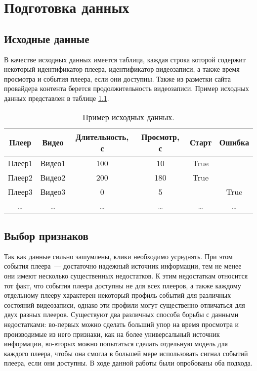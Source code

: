 \chapter{Подготовка данных}

\section{Исходные данные}

В качестве исходных данных имеется таблица, каждая строка которой содержит некоторый идентификатор плеера, идентификатор видеозаписи, а также время просмотра и события плеера, если они доступны. Также из разметки сайта провайдера контента берется продолжительность видеозаписи. Пример исходных данных представлен в таблице \ref{tab:raw_data}.

\begin{table}[h]
    \centering
    \begin{tabular}{|c|c|c|c|c|c|}
        \hline
        Плеер & Видео & Длительность, с & Просмотр, с & Старт & Ошибка \\
        \hline
        Плеер1 & Видео1 & 100 & 10 & True & \\
        \hline
        Плеер2 & Видео2 & 200 & 180 & True & \\
        \hline
        Плеер3 & Видео3 & 0 & 5 & & True \\
        \hline
        \ldots & \ldots & \ldots & \ldots & \ldots & \ldots \\
        \hline
    \end{tabular}
    \caption{Пример исходных данных.}
    \label{tab:raw_data}
\end{table}

\section{Выбор признаков}

Так как данные сильно зашумлены, клики необходимо усреднять. При этом события плеера~--- достаточно надежный источник информации, тем не менее они имеют несколько существенных недостатков. К этим недостаткам относится тот факт, что события плеера доступны не для всех плееров, а также каждому отдельному плееру характерен некоторый профиль событий для различных состояний видеозаписи, однако эти профили могут существенно отличаться для двух разных плееров. Существуют два различных способа борьбы с данными недостатками: во-первых можно сделать больший упор на время просмотра и производимые из него признаки, как на более универсальный источник информации, во-вторых можно попытаться сделать отдельную модель для каждого плеера, чтобы она смогла в большей мере использовать сигнал событий плеера, если они доступны. В ходе данной работы были опробованы оба подхода.

